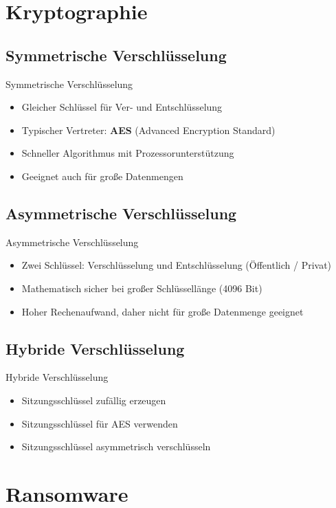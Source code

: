 \documentclass[notes,10pt]{beamer}
\begin{document}
\section{Kryptographie}
\subsection{Symmetrische Verschlüsselung}
\begin{frame}{Symmetrische Verschlüsselung}
	\begin{itemize}
		\item Gleicher Schlüssel für Ver- und Entschlüsselung
		\item Typischer Vertreter: \textbf{AES} (Advanced Encryption Standard)
		\item Schneller Algorithmus mit Prozessorunterstützung
		\item Geeignet auch für große Datenmengen
	\end{itemize}
\end{frame}
\subsection{Asymmetrische Verschlüsselung}
\begin{frame}{Asymmetrische Verschlüsselung}
	\begin{itemize}
		\item Zwei Schlüssel: Verschlüsselung und Entschlüsselung (Öffentlich / Privat)
		\item Mathematisch sicher bei großer Schlüssellänge (4096 Bit)
		\item Hoher Rechenaufwand, daher nicht für große Datenmenge geeignet
	\end{itemize}
\end{frame}
\subsection{Hybride Verschlüsselung}
\begin{frame}{Hybride Verschlüsselung}
	\begin{itemize}
		\item Sitzungsschlüssel zufällig erzeugen
		\item Sitzungsschlüssel für AES verwenden
		\item Sitzungsschlüssel asymmetrisch verschlüsseln
	\end{itemize}
\end{frame}

\section{Ransomware}
\end{document}
